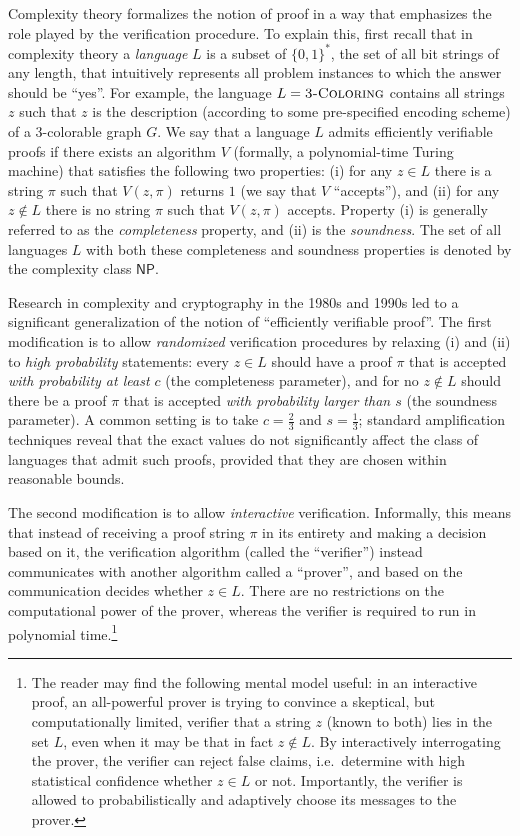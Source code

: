 \documentclass[11pt]{article}
\theoremstyle{definition}
\newcommand{\class}[1]{\ensuremath{\mathsf{#1}}\xspace}
\newcommand{\NP}{\class{NP}} %
\begin{document}
Complexity theory formalizes the notion of proof in a way that emphasizes the role played by the verification procedure. To explain this, first recall that in complexity theory a \emph{language} $L$ is a subset of $\{0,1\}^*$, the set of all bit strings of any length, that intuitively represents all problem instances to which the answer should be ``yes''. For example, the language $L=\textsc{3-Coloring}$ contains all strings $z$ such that $z$ is the description (according to some pre-specified encoding scheme) of a $3$-colorable graph $G$. We say that a language $L$ admits efficiently verifiable proofs if there exists an algorithm $V$ (formally, a polynomial-time Turing machine) that satisfies the following two properties: (i) for any $z\in L$ there is a string $\pi$ such that $V(z,\pi)$ returns $1$ (we say that $V$ ``accepts''), and (ii) for any $z\notin L$ there is no string $\pi$ such that $V(z,\pi)$ accepts. Property (i) is generally referred to as the \emph{completeness} property, and (ii) is the \emph{soundness}. The set of all languages $L$ with both these completeness and soundness properties is denoted by the complexity class $\NP$.

Research in complexity and cryptography in the 1980s and 1990s led to a significant generalization of the notion of ``efficiently verifiable proof''. The first modification is to allow \emph{randomized} verification procedures by relaxing (i) and (ii) to \emph{high probability} statements: every $z\in L$ should have a proof $\pi$ that is accepted \emph{with probability at least $c$} (the completeness parameter), and for no $z\notin L$ should there be a proof $\pi$ that is accepted \emph{with probability larger than $s$} (the soundness parameter).
A common setting is to take $c=\frac{2}{3}$ and $s=\frac{1}{3}$; standard amplification techniques reveal that the exact values do not significantly affect the class of languages that admit such proofs, provided that they are chosen within reasonable bounds. 

The second modification is to allow \emph{interactive} verification. 
Informally, this means that instead of receiving a proof string $\pi$ in its entirety and making a decision based on it, the verification algorithm (called the ``verifier'') instead communicates with another algorithm called a ``prover'', and based on the communication decides whether $z\in L$. There are no restrictions on the computational power of the prover, whereas the verifier is required to run in polynomial time.\footnote{The reader may find the following mental model useful: in an interactive proof, an all-powerful prover is trying to convince a skeptical, but computationally limited, verifier that a string $z$ (known to both) lies in the set $L$, even when it may be that in fact $z \notin L$. By interactively interrogating the prover, the verifier can reject false claims, i.e.\ determine with high statistical confidence whether $z \in L$ or not. Importantly, the verifier is allowed to probabilistically and adaptively choose its messages to the prover. }
\end{document}
